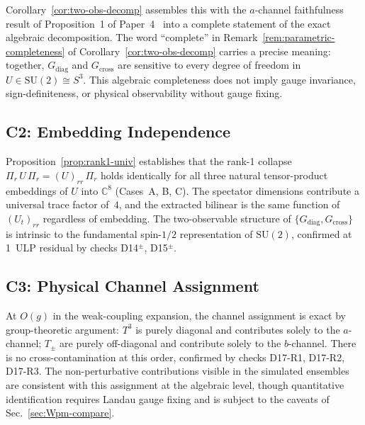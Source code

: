 \documentclass[12pt]{article}
\numberwithin{equation}{section}
\theoremstyle{plain}
\theoremstyle{definition}
\theoremstyle{remark}
\newcommand{\su}{\mathrm{SU}}              %
\newcommand{\Cplx}{\mathbb{C}}             %
\newcommand{\Gdiag}{G_{\mathrm{diag}}}     %
\newcommand{\Gcross}{G_{\mathrm{cross}}}   %
\newcommand{\Pir}{\Pi_{r}}                 %
\begin{document}
	Corollary~\ref{cor:two-obs-decomp} assembles this with the
	$a$-channel faithfulness result of Proposition~1 of
	Paper~4~\cite{FirestoneP4} into a complete statement of the exact
	algebraic decomposition.  The word ``complete'' in
	Remark~\ref{rem:parametric-completeness} of
	Corollary~\ref{cor:two-obs-decomp} carries a precise meaning:
	together, $\Gdiag$ and $\Gcross$ are sensitive to every degree of
	freedom in $U\in\su(2)\cong S^{3}$.  This algebraic completeness does
	not imply gauge invariance, sign-definiteness, or physical
	observability without gauge fixing.
	
	\subsection{C2: Embedding Independence}
	\label{sec:disc-embedding}
	
	Proposition~\ref{prop:rank1-univ} establishes that the rank-1
	collapse $\Pir\,U\,\Pir = (U)_{rr}\,\Pir$ holds identically for all
	three natural tensor-product embeddings of $U$ into $\Cplx^{8}$
	(Cases~A, B, C).  The spectator dimensions contribute a universal
	trace factor of~$4$, and the extracted bilinear is the same function
	of $(U_{t})_{rr}$ regardless of embedding.  The two-observable
	structure of $\{\Gdiag,\Gcross\}$ is intrinsic to the fundamental
	spin-$1/2$ representation of $\su(2)$, confirmed at 1~ULP residual
	by checks D14$^{\pm}$, D15$^{\pm}$.
	
	\subsection{C3: Physical Channel Assignment}
	\label{sec:disc-channel}
	
	At $O(g)$ in the weak-coupling expansion, the channel assignment is
	exact by group-theoretic argument: $T^{3}$ is purely diagonal and
	contributes solely to the $a$-channel; $T_{\pm}$ are purely
	off-diagonal and contribute solely to the $b$-channel.  There is no
	cross-contamination at this order, confirmed by checks D17-R1,
	D17-R2, D17-R3.  The non-perturbative contributions visible in the
	simulated ensembles are consistent with this assignment at the
	algebraic level, though quantitative identification requires Landau
	gauge fixing and is subject to the caveats of
	Sec.~\ref{sec:Wpm-compare}.
	
\end{document}
